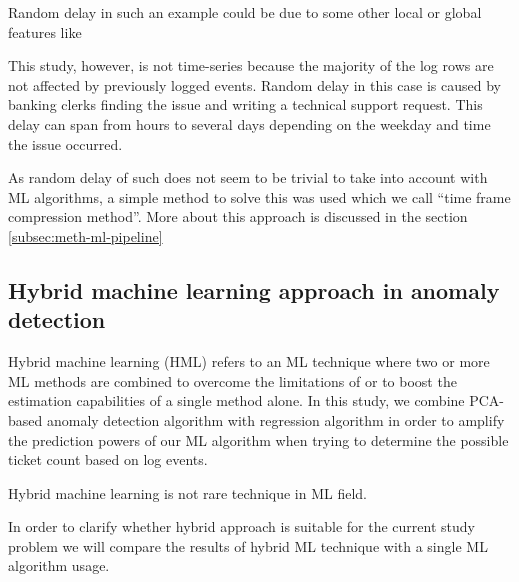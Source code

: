 Random delay in such an example
could be due to some other local or global features
like

This study, however,
is not time-series
because the majority of the log rows
are not affected by previously logged events.
Random delay in this case
is caused by banking clerks
finding the issue and writing a technical support request.
This delay can span from hours to several days
depending on the weekday and time the issue occurred.


As random delay of such
does not seem to be trivial to take into account
with ML algorithms, %
a simple method to solve this was used
which we call \enquote{time frame compression method}.
More about this approach is discussed in the section \ref{subsec:meth-ml-pipeline}



\subsection{Hybrid machine learning approach in anomaly detection}\label{subsec:bg-hybrid-ml-approach-with-anomaly-detection}

Hybrid machine learning (HML)
refers to an ML technique
where two or more ML methods are combined
to overcome the limitations of
or to boost the estimation capabilities of
a single method alone.\cite{Anifowose2020hml}
In this study,
we combine PCA-based anomaly detection algorithm
with regression algorithm
in order to amplify the prediction powers of our ML algorithm
when trying to determine the possible ticket count
based on log events.

Hybrid machine learning is not rare technique in ML field.\cite{shon2007hybrid,tsai2010credit,mohan2019effective,
    hsieh2005hybrid,jain2007hybrid,kim2007hybrid,lee2002credit,malhotra2002differentiating}

In order to clarify whether hybrid approach is suitable for the current study problem
we will compare the results of hybrid ML technique
with a single ML algorithm usage.




